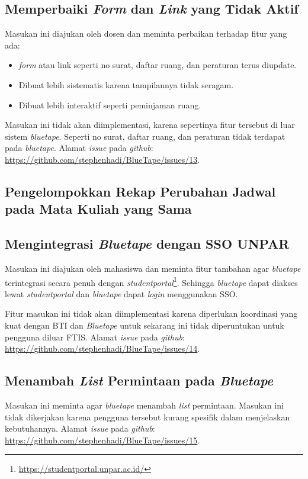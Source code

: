 \subsection{Memperbaiki \textit{Form} dan \textit{Link} yang Tidak Aktif}
\label{issue:13}
Masukan ini diajukan oleh dosen dan meminta perbaikan terhadap fitur yang ada: 
\begin{itemize}
	\item \textit{form} atau link seperti no surat, daftar ruang, dan peraturan terus diupdate.
	\item Dibuat lebih sistematis karena tampilannya tidak seragam.
	\item Dibuat lebih interaktif seperti peminjaman ruang.
\end{itemize}   

Masukan ini tidak akan diimplementasi, karena sepertinya fitur tersebut di luar sistem \textit{bluetape}. Seperti no surat, daftar ruang, dan peraturan tidak terdapat pada \textit{bluetape}. Alamat \textit{issue} pada \textit{github}: \url{https://github.com/stephenhadi/BlueTape/issues/13}. 

\subsection{Pengelompokkan Rekap Perubahan Jadwal pada Mata Kuliah yang Sama}
\label{issue:8}

\subsection{Mengintegrasi \textit{Bluetape} dengan SSO UNPAR}
\label{issue:14}
Masukan ini diajukan oleh mahasiswa dan meminta fitur tambahan agar \textit{bluetape} terintegrasi secara penuh dengan \textit{studentportal}\footnote{\url{https://studentportal.unpar.ac.id/}}. Sehingga \textit{bluetape} dapat diakses lewat \textit{studentportal} dan \textit{bluetape} dapat \textit{login} menggunakan SSO.

Fitur masukan ini tidak akan diimplementasi karena diperlukan koordinasi yang kuat dengan BTI dan \textit{Bluetape} untuk sekarang ini tidak diperuntukan untuk pengguna diluar FTIS. Alamat \textit{issue} pada \textit{github}: \url{https://github.com/stephenhadi/BlueTape/issues/14}. 

\subsection{Menambah \textit{List} Permintaan pada \textit{Bluetape}}
\label{issue:15}
Masukan ini meminta agar \textit{bluetape} menambah \textit{list} permintaan. Masukan ini tidak dikerjakan karena pengguna tersebut kurang spesifik dalam menjelaskan kebutuhannya. Alamat \textit{issue} pada \textit{github}: \url{https://github.com/stephenhadi/BlueTape/issues/15}. 

